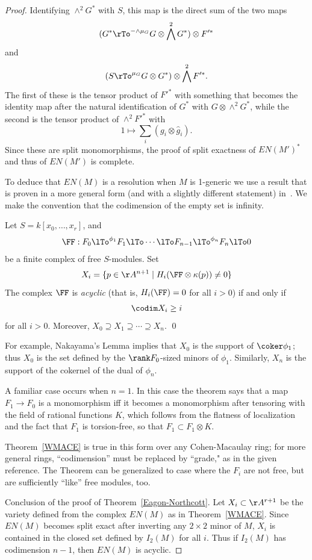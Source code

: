 \begin{proof}
 Identifying $\wedge^2 G^*$ with $S$, this map is the direct sum of the two maps
  $$
 (G^* \rTo^{-\wedge \mu_G} G\otimes \bigwedge^2 G^*)  \otimes F'^*
 $$
 and
 $$
(S  \rTo^{\mu_G} G\otimes G^*) \otimes \bigwedge^2 F'^*.
 $$
 The first of these is the tensor product of $F'^*$ with
 something that becomes the identity map after the natural identification of $G^*$ with $G\otimes \wedge^2 G^*$,
 while the second is the tensor product of $\wedge^2 F'^*$ with
  $$
 1 \mapsto \sum_i(g_i\otimes \widehat g_i).
 $$
Since these are split monomorphisms,
the proof of split exactness of $EN(M')^*$ and thus of $EN(M')$ is complete.

To deduce that $EN(M)$ is a resolution when $M$ is 1-generic we use
a result that is proven in a more general form (and with a slightly different statement) 
in~\cite[Theorem 20.9]{Eisenbud1995}. We make the convention
that the codimension of the empty set is infinity.

\begin{theorem}\label{WMACE}
 Let $S = k[x_0,\dots, x_r]$, and
 $$ 
\FF:  F_0\lTo^{\phi_1}F_1 \lTo \cdots \lTo F_{n-1}\lTo^{\phi_n} F_n\lTo 0
 $$
be a finite complex of free $S$-modules. Set
$$
X_i = \{p\in \AA^{n+1} \mid  H_i(\FF \otimes \kappa(p)) \neq 0\}
$$
The complex $\FF$ is \emph{acyclic} (that is, $H_i(\FF) = 0$ for all $i>0$) if and only if
$$
\codim X_i \geq i
$$
for all $i>0$. Moreover, $X_{0}\supseteq X_{1}\supseteq \cdots \supseteq X_{n}$.
\qed
\end{theorem}

For example, Nakayama's Lemma implies that $X_{0}$ is the support of $\coker \phi_{1}$; thus $X_{0}$ is the set defined by the $\rank F_{0}$-sized minors of $\phi_{1}$. Similarly, 
$X_{n}$ is the support of the cokernel of the dual of $\phi_{n}$. 

A familiar case occurs when  $n=1$. In this case the theorem says that a map $F_1\to F_0$ is a monomorphism iff it becomes a monomorphism after tensoring with the field of rational functions $K$, which follows from the flatness of
localization and the fact that $F_1$ is torsion-free, so that
$F_1 \subset F_1 \otimes K$. 

\begin{fact}
Theorem~\ref{WMACE} is true in this form over any Cohen-Macaulay ring; for more general
rings, ``codimension'' must be replaced by ``grade," as in the given reference.
The Theorem can be generalized
to case where the $F_i$ are not free, but are sufficiently ``like'' free modules, too.
\end{fact}

Conclusion of the proof of Theorem~\ref{Eagon-Northcott}.
Let $X_{i}\subset \AA^{r+1}$ be the variety defined from the complex $EN(M)$ as in 
Theorem~\ref{WMACE}. Since $EN(M)$ becomes split exact after inverting any $2\times 2$ minor of $M$,
$X_{i}$ is
contained in the closed set defined by $I_{2}(M)$ for all $i$. Thus if $I_{2}(M)$ has codimension $n-1$,
then $EN(M)$ is acyclic. 
\end {proof}

